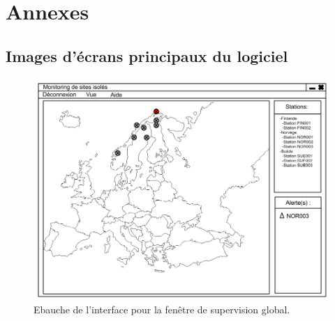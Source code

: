 \section{Annexes}

\subsection{Images d'écrans principaux du logiciel}

\begin{figure}[hb]
  \centering
  \includegraphics[width=15cm]{Supervision/InterfaceSupervision1.png}
  \caption[Ebauche de l'interface pour la fenêtre de supervision global.]%
  {Ebauche de l'interface pour la fenêtre de supervision global.}
\end{figure}

